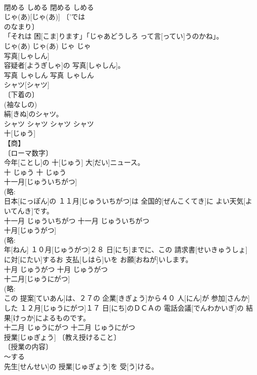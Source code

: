 \documentclass[8pt]{extreport}
\begin{document}
\begin{CJK}{UTF8}{min}
\\	閉める	しめる	閉める	しめる	
\\	じゃ(あ)[じゃ(あ)]	〔'では
\\	のなまり〕 
\\	[⇒-では]	「それは 困[こま]ります」「じゃあどうしろ って言[ってい]うのかね」。	
\\	じゃ(あ)	じゃ(あ)	じゃ	じゃ	
\\	写真[しゃしん]	
\\	容疑者[ようぎしゃ]の 写真[しゃしん]。	
\\	写真	しゃしん	写真	しゃしん	
\\	シャツ[シャツ]	
\\	〔下着の〕 
\\	(袖なしの) 
\\	絹[きぬ]のシャツ。	
\\	シャツ	シャツ	シャツ	シャツ	
\\	十[じゅう]	
\\	【商】 
\\	〔ローマ数字〕 
\\	今年[ことし]の 十[じゅう] 大[だい]ニュース。	
\\	十	じゅう	十	じゅう	
\\	十一月[じゅういちがつ]	
\\	(略: 
\\	日本[にっぽん]の １１月[じゅういちがつ]は 全国的[ぜんこくてき]に よい天気[よいてんき]です。	
\\	十一月	じゅういちがつ	十一月	じゅういちがつ	
\\	十月[じゅうがつ]	
\\	(略: 
\\	年[ねん] １０月[じゅうがつ]２８ 日[にち]までに、この 請求書[せいきゅうしょ] に対[にたい]するお 支払[しはら]いを お願[おねが]いします。	
\\	十月	じゅうがつ	十月	じゅうがつ	
\\	十二月[じゅうにがつ]	
\\	(略: 
\\	この 提案[ていあん]は、２７の 企業[きぎょう]から４０ 人[にん]が 参加[さんか]した １２月[じゅうにがつ]１７ 日[にち]のＤＣＡの 電話会議[でんわかいぎ]の 結果[けっか]によるものです。	
\\	十二月	じゅうにがつ	十二月	じゅうにがつ	
\\	授業[じゅぎょう]	〔教え授けること〕 
\\	〔授業の内容〕 
\\	～する 
\\	先生[せんせい]の 授業[じゅぎょう]を 受[う]ける。	

\end{CJK}
\end{document}
